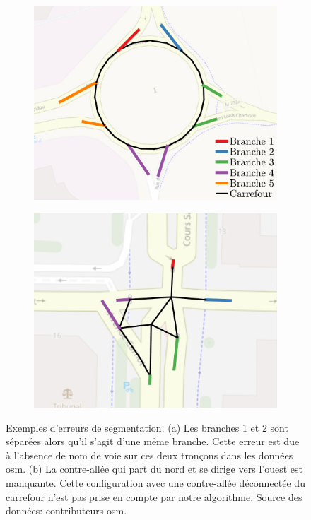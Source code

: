 \begin{figure}[ht]
    \centering
    \begin{subfigure}[t]{.4\linewidth}
        \centering
        \includegraphics[width=\linewidth]{images/evaluation/crseg/crseg_err_branches.pdf}
        \caption{}
    \end{subfigure}
    \begin{subfigure}[t]{.4\linewidth}
        \centering
        \includegraphics[width=\linewidth]{images/evaluation/crseg/crseg_err_manquant.pdf}
        \caption{}
    \end{subfigure}
    \caption[Exemples d'erreurs de segmentation]{Exemples d'erreurs de segmentation. (a) Les branches 1 et 2 sont séparées alors qu'il s'agit d'une même branche. Cette erreur est due à l'absence de nom de voie sur ces deux tronçons dans les données \gls{osm}. (b) La contre-allée qui part du nord et se dirige vers l'ouest est manquante. Cette configuration avec une contre-allée déconnectée du carrefour n'est pas prise en compte par notre algorithme. Source des données: contributeurs \gls{osm}.}
    \label{fig:eval_ex_err_crseg}
\end{figure}

